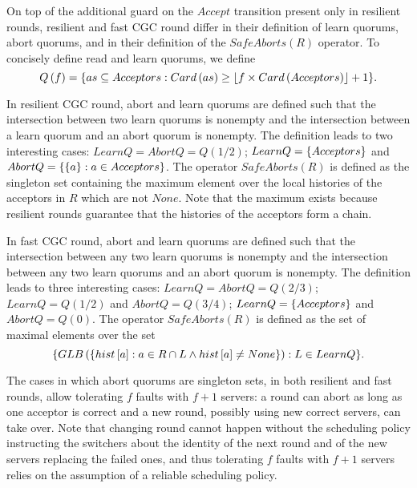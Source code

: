 \documentclass{llncs}
\begin{document}
On top of the additional guard on the $Accept$ transition present only
in resilient rounds, resilient and fast CGC round differ in
their definition of learn quorums, abort quorums, and in their
definition of the $SafeAborts\left( R \right)$ operator.
To concisely define read and learn quorums, we define 
\begin{equation}
    Q\left( f \right) = \aset{as \subseteq Acceptors :
        Card\left(as\right) \geq \left\lfloor f\times Card\left(
    Acceptors \right)\right\rfloor + 1}.
\end{equation}

In resilient CGC round, abort and learn quorums are defined such
that the intersection between two learn quorums is nonempty and the
intersection between a learn quorum and an abort quorum is nonempty.
The definition leads to two interesting cases: $LearnQ = AbortQ =
Q\left( 1/2 \right)$; $LearnQ = \left\{Acceptors\right\}$ and $AbortQ =
\left\{\left\{a\right\} : a \in Acceptors\right\}$. The operator $SafeAborts\left( R
\right)$ is defined as the singleton set containing the maximum
element over the local histories of the acceptors in $R$ which are not
$None$. Note that the maximum exists because resilient rounds
guarantee that the histories of the acceptors form a chain.

In fast CGC round, abort and learn quorums are defined such that
the intersection between any two learn quorums is nonempty and the
intersection between any two learn quorums and an abort quorum is
nonempty.  The definition leads to three interesting cases: $LearnQ =
AbortQ = Q\left( 2/3 \right)$; $LearnQ = Q\left( 1/2 \right)$ and
$AbortQ = Q\left( 3/4 \right)$; $LearnQ = \left\{Acceptors\right\}$ and
$AbortQ = Q\left( 0 \right)$.
The operator $SafeAborts\left( R \right)$ is defined as the set of
maximal elements over the set 
\begin{equation}
\aset{GLB\left( \aset{hist\left[ a
\right] : a \in R \cap L \wedge hist\left[ a \right]\neq None} \right)
: L \in LearnQ}.
\end{equation}

The cases in which abort quorums are singleton sets, in both
resilient and fast rounds, allow tolerating
$f$ faults with $f+1$ servers: a round can abort as long as one
acceptor is correct and a new round, possibly using new correct
servers, can take over. Note that changing round cannot happen
without the scheduling policy instructing the switchers about the
identity of the next round and of the new servers replacing the failed ones, and thus tolerating $f$ faults with
$f+1$ servers relies on the assumption of a reliable scheduling policy.
\end{document}

